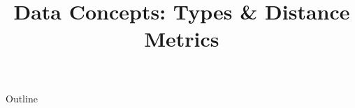 \documentclass[xcolor=dvipsnames,compress,t,pdf]{beamer}
\title[\insertframenumber /\inserttotalframenumber]{Data Concepts: Types \& Distance Metrics}
\begin{document}
	\begin{frame}
	\titlepage
	\end{frame}

	\begin{frame}{Outline}
	    \tableofcontents
	\end{frame}

	
	
	
\end{document}
